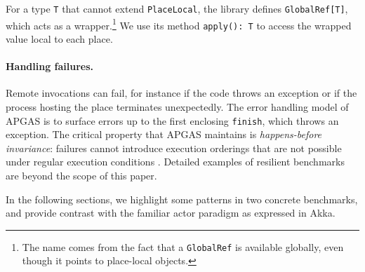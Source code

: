 For a type \lstinline{T} that cannot extend \lstinline{PlaceLocal}, the library
defines \lstinline{GlobalRef[T]}, which acts as a wrapper.\footnote{The name
comes from the fact that a \lstinline{GlobalRef} is available globally,
even though it points to place-local objects.}
We use its method \lstinline{apply(): T} to access the
wrapped value local to each place.

\paragraph{Handling failures.} Remote invocations can fail, for instance if the
code throws an exception or if the process hosting the place terminates
unexpectedly. The error handling model of APGAS is to surface errors up to the
first enclosing \lstinline{finish}, which throws an exception. The critical
property that APGAS maintains is \emph{happens-before invariance}: failures
cannot introduce execution orderings that are not possible under regular
execution conditions \cite{ppopp14,ecoop14}. Detailed examples of resilient
benchmarks are beyond the scope of this paper.

% 
% 
% 
% 
% 
% 
In the following sections, we highlight some \apgas patterns in two concrete
benchmarks, and provide contrast with the familiar actor paradigm as expressed in Akka.
